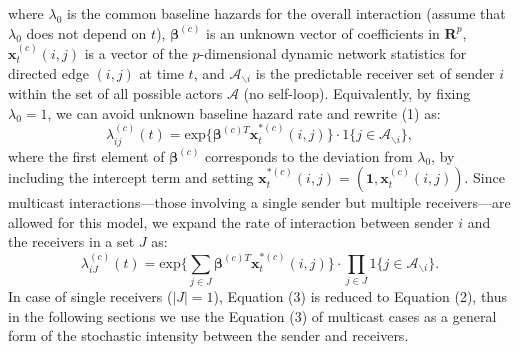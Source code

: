 \documentclass[a4paper]{article}
\begin{document}
where $\lambda_0$ is the common baseline hazards for the overall interaction (assume that $\lambda_0$ does not depend on $t$), $\boldsymbol{\beta}^{(c)}$ is an unknown vector of coefficients in $\boldsymbol{R}^{p}$, $\boldsymbol{x}^{(c)}_t(i, j)$ is a vector of the $p$-dimensional dynamic network statistics for directed edge $(i, j)$ at time $t$, and $\mathcal{A}_{\backslash i}$ is the predictable receiver set of sender $i$ within the set of all possible actors $\mathcal{A}$ (no self-loop). Equivalently, by fixing $\lambda_0=1$, we can avoid unknown baseline hazard rate and rewrite (1) as: 
\begin{equation}
\lambda^{(c)}_{ij}(t)= \mbox{exp}\Big\{\boldsymbol{\beta}^{(c)T}\boldsymbol{x}^{*(c)}_t(i, j)\Big\}\cdot 1\{j \in \mathcal{A}_{\backslash i}\},
\end{equation}
where the first element of $\boldsymbol{\beta}^{(c)}$ corresponds to the deviation from $\lambda_0$, by including the intercept term and setting $\boldsymbol{x}^{*(c)}_t(i, j)=(\boldsymbol{1}, \boldsymbol{x}^{(c)}_t(i, j))$. Since multicast interactions—those involving a single sender but multiple
receivers—are allowed for this model, we expand the rate of interaction between sender $i$ and the receivers in a set $J$ as:
\begin{equation}
\lambda^{(c)}_{iJ}(t)= \mbox{exp}\Big\{\sum\limits_{j \in J} \boldsymbol{\beta}^{(c)T}\boldsymbol{x}^{*(c)}_t(i, j)\Big\}\cdot \prod\limits_{j \in J}1\{j \in \mathcal{A}_{\backslash i}\}.
\end{equation}
In case of single receivers ($|J|=1$),  Equation (3) is reduced to Equation (2), thus in the following sections we use the Equation (3) of multicast cases as a general form of the stochastic intensity between the sender and receivers.
\end{document}
